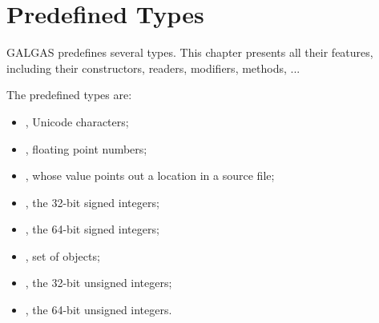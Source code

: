 \chapter{Predefined Types} \label{predefinedTypes}

GALGAS predefines several types. This chapter presents all their features, including their constructors, readers, modifiers, methods, ...


\begin{description}
\item The predefined types are:
\begin{itemize}
\item {}, Unicode characters;
\item {}, floating point numbers;
\item {}, whose value points out a location in a source file;
\item {}, the 32-bit signed integers;
\item {}, the 64-bit signed integers;
\item {}, set of  objects;
\item {}, the 32-bit unsigned integers;
\item {}, the 64-bit unsigned integers.
\end{itemize}
\end{description}










